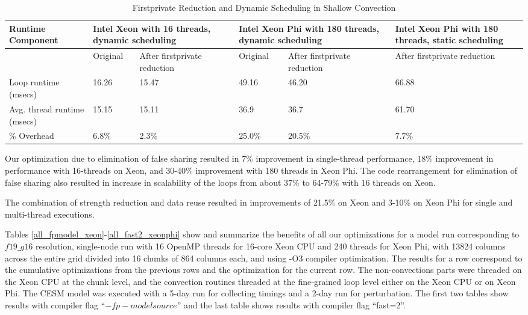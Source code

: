 \begin{table*}
 \small
 \centering
 \begin{tabular}{||p{1.5in}|p{0.75in}|p{0.75in}|p{0.75in}|p{0.75in}|p{1.5in}||}
\hline\hline
Runtime Component & \multicolumn{2}{|p{1.5in}|}{Intel Xeon with 16 threads, dynamic scheduling} & \multicolumn{2}{|p{1.5in}|}{Intel Xeon Phi with 180 threads, dynamic scheduling} & Intel Xeon Phi with 180 threads, static scheduling \\ \hline
  & Original & After firstprivate reduction & Original & After firstprivate reduction & After firstprivate reduction \\ \hline\hline
Loop runtime (msecs) & 16.26 & 15.47 & 49.16 & 46.20 & 66.88 \\ \hline
Avg. thread runtime (msecs) & 15.15 & 15.11 & 36.9 & 36.7 & 61.70 \\ \hline
\% Overhead & 6.8\% & 2.3\% & 25.0\% & 20.5\% & 7.7\% \\ \hline\hline
  \end{tabular}
\caption{Firstprivate Reduction and Dynamic Scheduling in Shallow Convection}
\label{firstprivate_reduction}
\end{table*}

Our optimization due to elimination of false sharing resulted in 7\% improvement in single-thread performance, 18\% improvement in performance with 16-threads on Xeon, and 30-40\% improvement with 180 threads in Xeon Phi. The code rearrangement for elimination of false sharing also resulted in increase in scalability of the loops from about 37\% to 64-79\% with 16 threads on Xeon.

The combination of strength reduction and data reuse resulted in improvements of 21.5\% on Xeon and 3-10\% on Xeon Phi for single and multi-thread executions.

Tables \ref{all_fpmodel_xeon}-\ref{all_fast2_xeonphi} show and summarize the benefits of all our optimizations for a model run corresponding to $f19\_g16$ resolution, single-node run with 16 OpenMP threads for 16-core Xeon CPU and 240 threads for Xeon Phi, with 13824 columns across the entire grid divided into 16 chunks of 864 columns each, and using -O3 compiler optimization. The results for a row correspond to the cumulative optimizations from the previous rows and the optimization for the current row. The non-convections parts were threaded on the Xeon CPU at the chunk level, and the convection routines threaded at the fine-grained loop level either on the Xeon CPU or on Xeon Phi. The CESM model was executed with a 5-day run for collecting timings and a 2-day run for perturbation. The first two tables show results with compiler flag ``$-fp-model source$'' and the last table shows results with compiler flag ``fast=2''.


